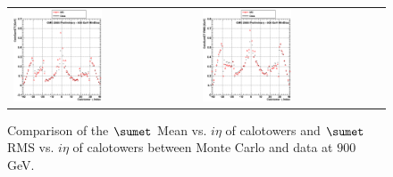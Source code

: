 \begin{figure}[h!]
 \centering
 \begin{tabular}{ll}
  \includegraphics[width=0.5\textwidth]{plots_DataVsMC_MB_900GeV/g_caloSumetMean_vs_ieta_900.eps} &
  \includegraphics[width=0.5\textwidth]{plots_DataVsMC_MB_900GeV/g_caloSumetRMS_vs_ieta_900.eps} \\
 \end{tabular}
 \caption{\small Comparison of the $\sumet$ Mean vs. $i\eta$ of calotowers and $\sumet$ RMS vs. $i\eta$ of calotowers between 
          Monte Carlo and data at $900$ GeV.\label{fig:SumET_MeanRMS_vs_ieta_900}}
\end{figure}

